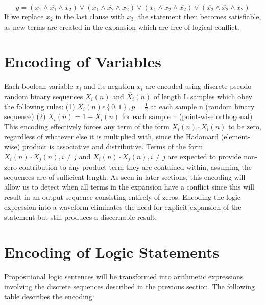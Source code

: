 \documentclass[reqno]{amsart}
\theoremstyle{definition}
\theoremstyle{remark}
\begin{document}
\begin{equation}
y = (x_1\wedge\overline{x_1}\wedge x_2) \vee (x_1 \wedge \overline{x_2} \wedge x_2) \vee (x_1\wedge x_2\wedge \overline{x_2} ) \vee (\overline{x_2}\wedge \overline{x_2}\wedge x_2)
\end{equation}
\newline
\noindent
If we replace $x_2$ in the last clause with $x_3$, the statement then becomes satisfiable, as new terms are created in the expansion which are free of logical conflict.


\section{Encoding of Variables}
\noindent
Each boolean variable $x_i$ and its negation $\overline{x_i}$ are encoded using discrete pseudo-random binary 
sequences $X_i(n)$ and $\overline{X_i}(n)$ of length L samples which obey the following
rules: \newline\newline
(1) $X_i(n) \epsilon\left \{ 0,1 \right \}, p=\frac{1}{2}$ at each sample n (random binary sequence) \newline
(2) $\overline{X_i}(n) =  1-X_i(n)$  for each sample n (point-wise orthogonal) \newline
\newline
\noindent
This encoding effectively forces any term of the form $X_i(n) \cdot \overline{X_i}(n)$ to be zero, regardless
of whatever else it is multiplied with, since the Hadamard (element-wise) product is associative and distributive. Terms of the form $X_i(n) \cdot X_j(n), i \neq j$ and $X_i(n) \cdot \overline{X_j}(n), i \neq j$ are expected to provide non-zero contribution to any product term they are contained within, assuming the sequences are of sufficient length.
As seen in later sections, this encoding will allow us to detect when all terms in the expansion have a conflict since this will result in an output sequence consisting entirely of zeros. Encoding the logic expression into a waveform eliminates the need for explicit 
expansion of the statement but still produces a discernable result.
\newline


\section{Encoding of Logic Statements}
\noindent
Propositional logic sentences will be transformed into arithmetic expressions involving the discrete sequences
described in the previous section. The following table describes the encoding:
\end{document}

